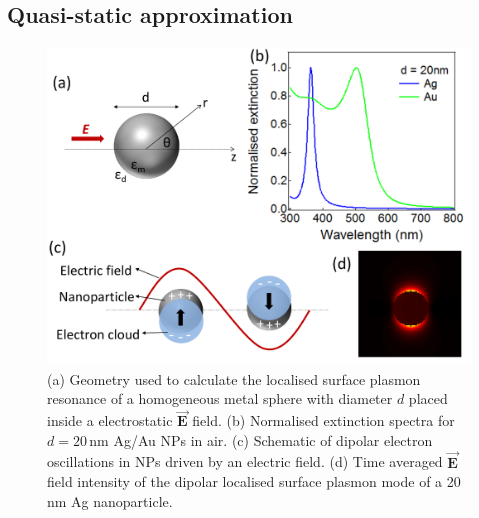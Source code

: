 \subsection{Quasi-static approximation}
\begin{figure}[h!] 
\centering    
\includegraphics[width=\textwidth]{Fig7}
\caption{(a) Geometry used to calculate the localised surface plasmon resonance of a homogeneous metal sphere with diameter $d$ placed inside a electrostatic $\vec{\mathbf{E}}$ field. (b) Normalised extinction spectra for $d=20$\,nm Ag/Au NPs in air. (c) Schematic of dipolar electron oscillations in NPs driven by an electric field. (d) Time averaged $\vec{\mathbf{E}}$ field intensity of the dipolar localised surface plasmon mode of a 20\,nm Ag nanoparticle.}
\label{3Fig7}
\end{figure} 

